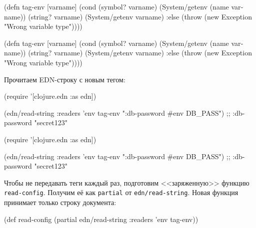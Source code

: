 \ifx\DEVICETYPE\MOBILE

\begin{english}
  \begin{clojure}
(defn tag-env
  [varname]
  (cond
    (symbol? varname)
    (System/getenv (name varname))
    (string? varname)
    (System/getenv varname)
    :else
    (throw
      (new Exception
        "Wrong variable type"))))
  \end{clojure}
\end{english}

\else

\begin{english}
  \begin{clojure}
(defn tag-env
  [varname]
  (cond
    (symbol? varname)
    (System/getenv (name varname))
    (string? varname)
    (System/getenv varname)
    :else
    (throw (new Exception "Wrong variable type"))))
  \end{clojure}
\end{english}

\fi

\noindent
Прочитаем EDN-строку с новым тегом:

\ifx\DEVICETYPE\MOBILE

\begin{english}
  \begin{clojure}
(require '[clojure.edn :as edn])

(edn/read-string
  {:readers {'env tag-env}}
  "{:db-password #env DB_PASS}")
;; {:db-password "secret123"}
  \end{clojure}
\end{english}

\else

\begin{english}
  \begin{clojure}
(require '[clojure.edn :as edn])

(edn/read-string {:readers {'env tag-env}}
                 "{:db-password #env DB_PASS}")
;; {:db-password "secret123"}
  \end{clojure}
\end{english}

\fi

Чтобы не передавать теги каждый раз, подготовим <<заряженную>> функцию
\verb|read-config|. Получим её как \verb|partial| от \verb|edn/read-string|.
Новая функция принимает только строку документа:

\begin{english}
  \begin{clojure}
(def read-config
  (partial edn/read-string
           {:readers {'env tag-env}}))
  \end{clojure}
\end{english}

